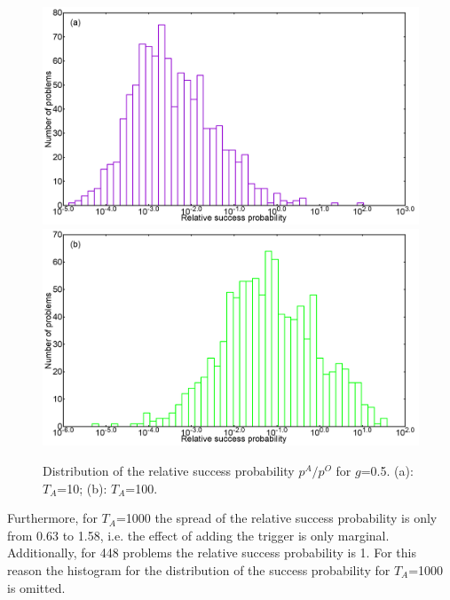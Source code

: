 \documentclass[../main.tex]{subfiles}
\begin{document}
\begin{figure}
\centering 
\includegraphics[scale=0.24]{A_T10_g2.png}
\includegraphics[scale=0.24]{A_T100_g2.png}
\caption{Distribution of the relative success probability $p^A/p^O$ for $g$=0.5. (a): $T_A$=10; (b): $T_A$=100.}
\label{fig:a37}
\end{figure}
Furthermore, for $T_A$=1000 the spread of the relative success probability is only from 0.63 to 1.58, i.e. the effect of adding the trigger is only marginal. Additionally, for 448 problems the relative success probability is 1. For this reason the histogram for the distribution of the success probability for $T_A$=1000 is omitted.
\end{document}

